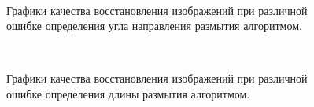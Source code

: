 
\begin{figure}[H]
\begin{minipage}[8]{1\linewidth}
 \\ 
\end{minipage}
\caption{ Графики качества восстановления изображений при различной ошибке определения угла направления размытия алгоритмом. }
\label{ris:plots_a}
\end{figure}

\begin{figure}[H]
\begin{minipage}[t]{1\linewidth}
  \\ 
\end{minipage}
\caption{ Графики качества восстановления изображений при различной ошибке определения длины размытия алгоритмом. }
\label{ris:plots_l}
\end{figure}


